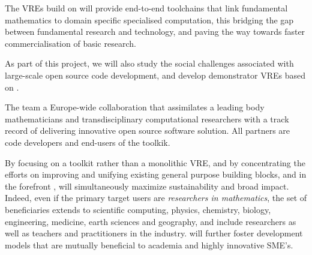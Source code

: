 The VREs build on \TheProject will provide end-to-end toolchains that
link fundamental mathematics to domain specific specialised
computation, this bridging the gap between fundamental research and
technology, and paving the way towards faster commercialisation of
basic research.

As part of this project, we will also study the social challenges
associated with large-scale open source code development, and develop
demonstrator VREs based on \TheProject.

The \TheProject team a Europe-wide collaboration that assimilates a
leading body mathematicians and transdisciplinary computational
researchers with a track record of delivering innovative open source
software solution. All partners are code developers and end-users of the
toolkik.

By focusing on a toolkit rather than a monolithic VRE, and by
concentrating the efforts on improving and unifying existing general
purpose building blocks, and in the forefront \Jupyter, \TheProject
will simultaneously maximize sustainability and broad impact. Indeed,
even if the primary target users are \emph{researchers in
  mathematics}, the set of beneficiaries extends to scientific
computing, physics, chemistry, biology, engineering, medicine, earth
sciences and geography, and include researchers as well as teachers
and practitioners in the industry. \TheProject will further foster
development models that are mutually beneficial to academia and highly
innovative SME's.






\clearpage


